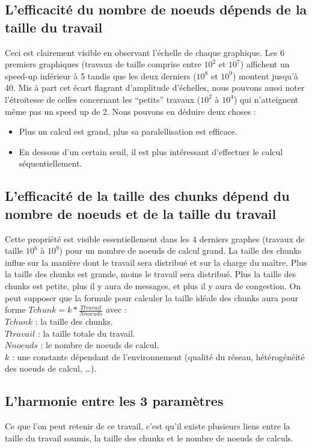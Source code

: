 \documentclass[oneside,10pt]{article}
\begin{document}
\subsection{L'efficacit\'e du nombre de noeuds d\'epends de la taille du travail}
Ceci est clairement visible en observant l'\'echelle de chaque graphique.
Les 6 premiers graphiques (travaux de taille comprise entre $10^2$ et $10^7$) affichent un speed-up inf\'erieur \`a 5 tandis que les deux derniers ($10^8$ et $10^9$) montent jusqu'\`a 40.
Mis \`a part cet \'ecart flagrant d'amplitude d'\'echelles, nous pouvons aussi noter l'\'etroitesse de celles concernant les ``petits'' travaux ($10^2$ \`a $10^4$) qui n'atteignent m\^eme pas un speed up de 2.
Nous pouvons en d\'eduire deux choses :
\begin{itemize}
\item Plus un calcul est grand, plus sa paralellisation est efficace.
\item En dessous d'un certain seuil, il est plus int\'eressant d'effectuer le calcul s\'equentiellement.
\end{itemize}

\subsection{L'efficacit\'e de la taille des chunks d\'epend du nombre de noeuds et de la taille du travail}
Cette propri\'et\'e est visible essentiellement dans les 4 derniers graphes (travaux de taille $10^6$ \`a $10^9$) pour un nombre de noeuds de calcul grand.
La taille des chunks influe sur la mani\`ere dont le travail sera distribu\'e et sur la charge du ma\^itre.
Plus la taille des chunks est grande, moins le travail sera distribu\'e.
Plus la taille des chunks est petite, plus il y aura de messages, et plus il y aura de congestion.
On peut supposer que la formule pour calculer la taille id\'eale des chunks aura pour forme $Tchunk = k * \frac{Ttravail}{Nnoeuds}$ avec :\\
$Tchunk$ : la taille des chunks.\\
$Ttravail$ : la taille totale du travail.\\
$Nnoeuds$ : le nombre de noeuds de calcul.\\
$k$ : une constante d\'ependant de l'environnement (qualit\'e du r\'eseau, h\'et\'erog\'en\'eit\'e des noeuds de calcul, \ldots).

\subsection{L'harmonie entre les 3 param\`etres}
Ce que l'on peut retenir de ce travail, c'est qu'il existe plusieurs liens entre la taille du travail soumis, la taille des chunks et le nombre de noeuds de calculs.
\end{document}
